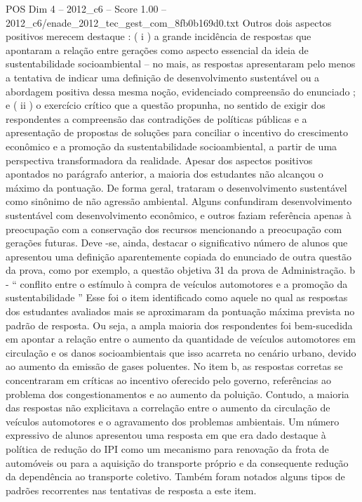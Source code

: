 \begin{textsample}{POS Dim 4 – 2012\_c6 – Score 1.00 – 2012\_c6/enade\_2012\_tec\_gest\_com\_8fb0b169d0.txt}
Outros dois aspectos positivos merecem destaque : ( i ) a grande incidência de respostas que apontaram a relação entre gerações como aspecto essencial da ideia de sustentabilidade socioambiental – no mais, as respostas apresentaram pelo menos a tentativa de indicar uma definição de desenvolvimento sustentável ou a abordagem positiva dessa mesma noção, evidenciado compreensão do enunciado ; e ( ii ) o exercício crítico que a questão propunha, no sentido de exigir dos respondentes a compreensão das contradições de políticas públicas e a apresentação de propostas de soluções para conciliar o incentivo do crescimento econômico e a promoção da sustentabilidade socioambiental, a partir de uma perspectiva transformadora da realidade.
Apesar dos aspectos positivos apontados no parágrafo anterior, a maioria dos estudantes não alcançou o máximo da pontuação.
De forma geral, trataram o desenvolvimento sustentável como sinônimo de não agressão ambiental.
Alguns confundiram desenvolvimento sustentável com desenvolvimento econômico, e outros faziam referência apenas à preocupação com a conservação dos recursos mencionando a preocupação com gerações futuras.
Deve -se, ainda, destacar o significativo número de alunos que apresentou uma definição aparentemente copiada do enunciado de outra questão da prova, como por exemplo, a questão objetiva 31 da prova de Administração. b - “ conflito entre o estímulo à compra de veículos automotores e a promoção da sustentabilidade ” Esse foi o item identificado como aquele no qual as respostas dos estudantes avaliados mais se aproximaram da pontuação máxima prevista no padrão de resposta.
Ou seja, a ampla maioria dos respondentes foi bem-sucedida em apontar a relação entre o aumento da quantidade de veículos automotores em circulação e os danos socioambientais que isso acarreta no cenário urbano, devido ao aumento da emissão de gases poluentes.
No item b, as respostas corretas se concentraram em críticas ao incentivo oferecido pelo governo, referências ao problema dos congestionamentos e ao aumento da poluição.
Contudo, a maioria das respostas não explicitava a correlação entre o aumento da circulação de veículos automotores e o agravamento dos problemas ambientais.
Um número expressivo de alunos apresentou uma resposta em que era dado destaque à política de redução do IPI como um mecanismo para renovação da frota de automóveis ou para a aquisição do transporte próprio e da consequente redução da dependência ao transporte coletivo.
Também foram notados alguns tipos de padrões recorrentes nas tentativas de resposta a este item.

\end{textsample}
